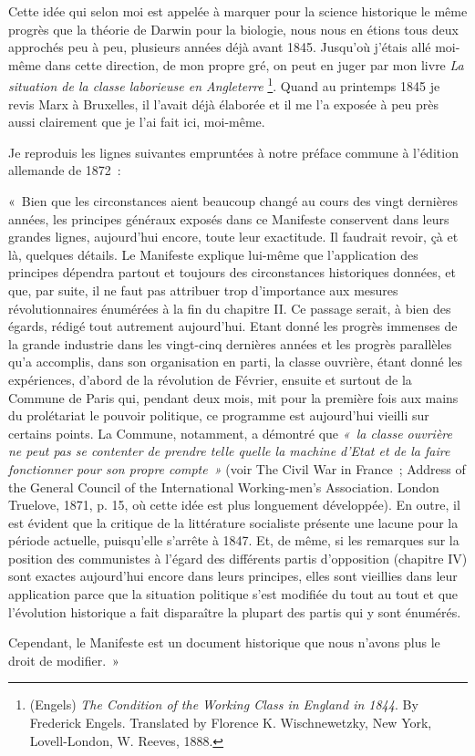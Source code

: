 \documentclass[french,twoside]{book} %
\newenvironment{quoteblock}%
  {\begin{quoting}}
  {\end{quoting}}
\newenvironment{quotebar}{%
    \def\FrameCommand{{\color{rubric!10!}\vrule width 0.5em} \hspace{0.9em}}%
    \def\OuterFrameSep{\itemsep} %
    \MakeFramed {\advance\hsize-\width \FrameRestore}
  }%
  {%
    \endMakeFramed
  }
\renewenvironment{quoteblock}%
  {%
    \savenotes
    \setstretch{0.9}
    \normalfont
    \begin{quotebar}
  }
  {%
    \end{quotebar}
    \spewnotes
  }
\begin{document}
Cette idée qui selon moi est appelée à marquer pour la science historique le même progrès que la théorie de Darwin pour la biologie, nous nous en étions tous deux approchés peu à peu, plusieurs années déjà avant 1845. Jusqu’où j’étais allé moi-même dans cette direction, de mon propre gré, on peut en juger par mon livre \emph{La situation de la classe laborieuse en Angleterre} \footnote{(Engels) \emph{The Condition of the Working Class in England in 1844}. By Frederick Engels. Translated by Florence K. Wischnewetzky, New York, Lovell-London, W. Reeves, 1888.}. Quand au printemps 1845 je revis Marx à Bruxelles, il l’avait déjà élaborée et il me l’a exposée à peu près aussi clairement que je l’ai fait ici, moi-même.\par
Je reproduis les lignes suivantes empruntées à notre préface commune à l’édition allemande de 1872 :\par

\begin{quoteblock}
 \noindent « Bien que les circonstances aient beaucoup changé au cours des vingt dernières années, les principes généraux exposés dans ce Manifeste conservent dans leurs grandes lignes, aujourd’hui encore, toute leur exactitude. Il faudrait revoir, çà et là, quelques détails. Le Manifeste explique lui-même que l’application des principes dépendra partout et toujours des circonstances historiques données, et que, par suite, il ne faut pas attribuer trop d’importance aux mesures révolutionnaires énumérées à la fin du chapitre II. Ce passage serait, à bien des égards, rédigé tout autrement aujourd’hui. Etant donné les progrès immenses de la grande industrie dans les vingt-cinq dernières années et les progrès parallèles qu’a accomplis, dans son organisation en parti, la classe ouvrière, étant donné les expériences, d’abord de la révolution de Février, ensuite et surtout de la Commune de Paris qui, pendant deux mois, mit pour la première fois aux mains du prolétariat le pouvoir politique, ce programme est aujourd’hui vieilli sur certains points. La Commune, notamment, a démontré que \emph{« la classe ouvrière ne peut pas se contenter de prendre telle quelle la machine d’Etat et de la faire fonctionner pour son propre compte »} (voir The Civil War in France ; Address of the General Council of the International Working-men’s Association. London Truelove, 1871, p. 15, où cette idée est plus longuement développée). En outre, il est évident que la critique de la littérature socialiste présente une lacune pour la période actuelle, puisqu’elle s’arrête à 1847. Et, de même, si les remarques sur la position des communistes à l’égard des différents partis d’opposition (chapitre IV) sont exactes aujourd’hui encore dans leurs principes, elles sont vieillies dans leur application parce que la situation politique s’est modifiée du tout au tout et que l’évolution historique a fait disparaître la plupart des partis qui y sont énumérés.\par
 Cependant, le Manifeste est un document historique que nous n’avons plus le droit de modifier. »
 \end{quoteblock}
\end{document}

